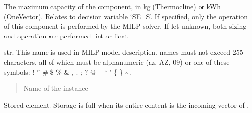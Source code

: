 \documentclass[letterpaper,10pt,english]{sphinxmanual}
\begin{document}
\begin{fulllineitems}
\begin{fulllineitems}
\label{\detokenize{generated/tamos.storage.Thermocline:tamos.storage.Thermocline.given_sizing}}
\pysigstartsignatures
{}
\pysigstopsignatures
\sphinxAtStartPar
The maximum capacity of the component, in kg (Thermocline) or kWh (OneVector).
Relates to decision variable ‘SE\_S’.
If specified, only the operation of this component is performed by the MILP solver.
If let unknown, both sizing and operation are performed.
int or float

\end{fulllineitems}


\begin{fulllineitems}
\label{\detokenize{generated/tamos.storage.Thermocline:tamos.storage.Thermocline.name}}
\pysigstartsignatures
{}
\pysigstopsignatures
\sphinxAtStartPar
str.
This name is used in MILP model description.
names must not exceed 255 characters,
all of which must be alphanumeric (a\sphinxhyphen{}z, A\sphinxhyphen{}Z, 0\sphinxhyphen{}9) or one of these symbols:
! ” \# \$ \% \& , . ; ? @ \_ ‘ ’ \{ \} \textasciitilde{}.
\begin{quote}\begin{description}
\sphinxAtStartPar
Name of the instance

\end{description}\end{quote}

\end{fulllineitems}


\begin{fulllineitems}
\label{\detokenize{generated/tamos.storage.Thermocline:tamos.storage.Thermocline.stored_TVP}}
\pysigstartsignatures
{}
\pysigstopsignatures
\sphinxAtStartPar
Stored element.
Storage is full when its entire content is the incoming vector of .


\end{fulllineitems}
\end{fulllineitems}
\end{document}
